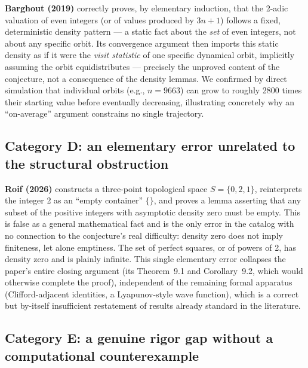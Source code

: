 \documentclass[11pt]{article}
\begin{document}
\textbf{Barghout (2019)} \cite{Barghout2019} correctly proves, by
elementary induction, that the 2-adic valuation of even integers (or of
values produced by \(3n+1\)) follows a fixed, deterministic density
pattern --- a static fact about the \emph{set} of even integers, not
about any specific orbit. Its convergence argument then imports this
static density as if it were the \emph{visit statistic} of one specific
dynamical orbit, implicitly assuming the orbit equidistributes ---
precisely the unproved content of the conjecture, not a consequence of
the density lemmas. We confirmed by direct simulation that individual
orbits (e.g., \(n=9663\)) can grow to roughly 2800 times their starting
value before eventually decreasing, illustrating concretely why an
``on-average'' argument constrains no single trajectory.

\subsection{Category D: an elementary error unrelated to the structural obstruction}
\label{sec:catD}

\textbf{Roif (2026)} \cite{Roif2026} constructs a three-point
topological space \(S=\{0,2,1\}\), reinterprets the integer 2 as an
``empty container'' \(\{\}\), and proves a lemma asserting that any
subset of the positive integers with asymptotic density zero must be
empty. This is false as a general mathematical fact and is the only
error in the catalog with no connection to the conjecture's real
difficulty: density zero does not imply finiteness, let alone
emptiness. The set of perfect squares, or of powers of 2, has density
zero and is plainly infinite. This single elementary error collapses
the paper's entire closing argument (its Theorem~9.1 and
Corollary~9.2, which would otherwise complete the proof), independent
of the remaining formal apparatus (Clifford-adjacent identities, a
Lyapunov-style wave function), which is a correct but by-itself
insufficient restatement of results already standard in the
literature.

\subsection{Category E: a genuine rigor gap without a computational counterexample}
\label{sec:catE}
\end{document}
